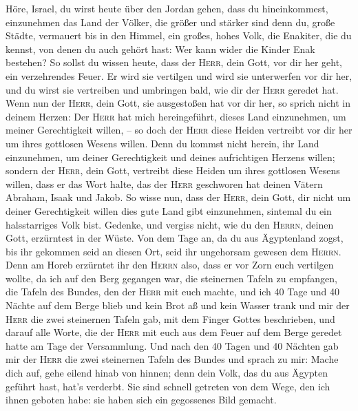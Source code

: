  Höre, Israel, du wirst heute über den Jordan gehen, dass
du hineinkommest, einzunehmen das Land der Völker, die größer und
stärker sind denn du, große Städte, vermauert bis in den Himmel,
 ein großes, hohes Volk, die Enakiter, die du kennst, von
denen du auch gehört hast: Wer kann wider die Kinder Enak bestehen?
 So sollst du wissen heute, dass der \textsc{Herr}, dein
Gott, vor dir her geht, ein verzehrendes Feuer. Er wird sie vertilgen
und wird sie unterwerfen vor dir her, und du wirst sie vertreiben und
umbringen bald, wie dir der \textsc{Herr} geredet hat. 
Wenn nun der \textsc{Herr}, dein Gott, sie ausgestoßen hat vor dir her,
so sprich nicht in deinem Herzen: Der \textsc{Herr} hat mich
hereingeführt, dieses Land einzunehmen, um meiner Gerechtigkeit willen,
-- so doch der \textsc{Herr} diese Heiden vertreibt vor dir her um ihres
gottlosen Wesens willen.  Denn du kommst nicht herein, ihr
Land einzunehmen, um deiner Gerechtigkeit und deines aufrichtigen
Herzens willen; sondern der \textsc{Herr}, dein Gott, vertreibt diese
Heiden um ihres gottlosen Wesens willen, dass er das Wort halte, das der
\textsc{Herr} geschworen hat deinen Vätern Abraham, Isaak und Jakob.
 So wisse nun, dass der \textsc{Herr}, dein Gott, dir
nicht um deiner Gerechtigkeit willen dies gute Land gibt einzunehmen,
sintemal du ein halsstarriges Volk bist.  Gedenke, und
vergiss nicht, wie du den \textsc{Herrn}, deinen Gott, erzürntest in der
Wüste. Von dem Tage an, da du aus Ägyptenland zogst, bis ihr gekommen
seid an diesen Ort, seid ihr ungehorsam gewesen dem \textsc{Herrn}.
 Denn am Horeb erzürntet ihr den \textsc{Herrn} also, dass
er vor Zorn euch vertilgen wollte,  da ich auf den Berg
gegangen war, die steinernen Tafeln zu empfangen, die Tafeln des Bundes,
den der \textsc{Herr} mit euch machte, und ich 40 Tage und 40 Nächte auf
dem Berge blieb und kein Brot aß und kein Wasser trank 
und mir der \textsc{Herr} die zwei steinernen Tafeln gab, mit dem Finger
Gottes beschrieben, und darauf alle Worte, die der \textsc{Herr} mit
euch aus dem Feuer auf dem Berge geredet hatte am Tage der Versammlung.
 Und nach den 40 Tagen und 40 Nächten gab mir der
\textsc{Herr} die zwei steinernen Tafeln des Bundes  und
sprach zu mir: Mache dich auf, gehe eilend hinab von hinnen; denn dein
Volk, das du aus Ägypten geführt hast, hat's verderbt. Sie sind schnell
getreten von dem Wege, den ich ihnen geboten habe: sie haben sich ein
gegossenes Bild gemacht.


